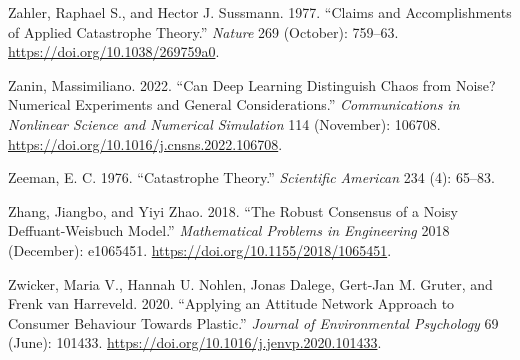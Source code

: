 \documentclass[
  a4paper,
  DIV=11,
  numbers=noendperiod]{scrreprt}
\newlength{\cslhangindent}
\newlength{\cslentryspacingunit} %
\newenvironment{CSLReferences}[2] %
 {%
  \setlength{\parindent}{0pt}
  \ifodd #1
  \let\oldpar\par
  \def\par{\hangindent=\cslhangindent\oldpar}
  \fi
  \setlength{\parskip}{#2\cslentryspacingunit}
 }%
 {}
\begin{document}
\begin{CSLReferences}{1}{0}
\leavevmode{}%
Zahler, Raphael S., and Hector J. Sussmann. 1977. {``Claims and
Accomplishments of Applied Catastrophe Theory.''} \emph{Nature} 269
(October): 759--63. \url{https://doi.org/10.1038/269759a0}.

\leavevmode{}%
Zanin, Massimiliano. 2022. {``Can Deep Learning Distinguish Chaos from
Noise? Numerical Experiments and General Considerations.''}
\emph{Communications in Nonlinear Science and Numerical Simulation} 114
(November): 106708. \url{https://doi.org/10.1016/j.cnsns.2022.106708}.

\leavevmode{}%
Zeeman, E. C. 1976. {``Catastrophe {Theory}.''} \emph{Scientific
American} 234 (4): 65--83.

\leavevmode{}%
Zhang, Jiangbo, and Yiyi Zhao. 2018. {``The {Robust Consensus} of a
{Noisy Deffuant-Weisbuch Model}.''} \emph{Mathematical Problems in
Engineering} 2018 (December): e1065451.
\url{https://doi.org/10.1155/2018/1065451}.

\leavevmode{}%
Zwicker, Maria V., Hannah U. Nohlen, Jonas Dalege, Gert-Jan M. Gruter,
and Frenk van Harreveld. 2020. {``Applying an Attitude Network Approach
to Consumer Behaviour Towards Plastic.''} \emph{Journal of Environmental
Psychology} 69 (June): 101433.
\url{https://doi.org/10.1016/j.jenvp.2020.101433}.

\end{CSLReferences}



\printindex
\end{document}
